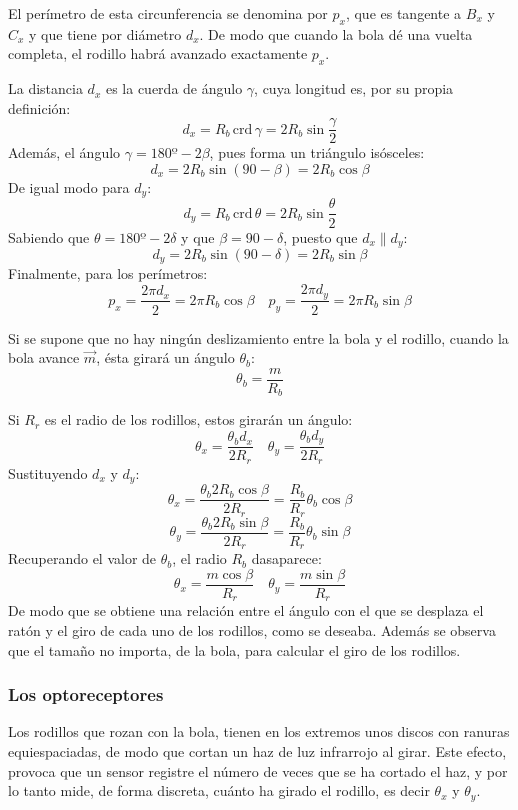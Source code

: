 \documentclass[10pt,a4paper,hidelinks,twocolumn]{article}
\begin{document}
El perímetro de esta circunferencia se denomina por $p_x$, que es tangente a 
$B_x$ y $C_x$ y que tiene por diámetro $d_x$. De modo que cuando la bola dé una 
vuelta completa, el rodillo habrá avanzado exactamente $p_x$.

La distancia $d_x$ es la cuerda de ángulo $\gamma$, cuya longitud es, por su 
propia definición:
$$ d_x = R_b \, \text{crd} \, \gamma = 2R_b \sin \frac{\gamma}{2}$$
Además, el ángulo $\gamma = 180º - 2\beta$, pues forma un triángulo isósceles:
$$ d_x = 2R_b \sin(90-\beta) = 2R_b\cos \beta$$
De igual modo para $d_y$:
$$ d_y = R_b \, \text{crd} \, \theta = 2R_b \sin \frac{\theta}{2} $$
Sabiendo que $\theta = 180º - 2\delta$ y que $\beta = 90 - \delta$, puesto que 
$d_x \parallel d_y$:
$$ d_y = 2R_b \sin (90 - \delta) = 2R_b \sin \beta $$
Finalmente, para los perímetros:
$$ p_x = \frac{2\pi d_x}{2} = 2 \pi R_b\cos \beta \quad  p_y = \frac{2\pi 
d_y}{2} = 2 \pi R_b\sin \beta $$

Si se supone que no hay ningún deslizamiento entre la bola y el rodillo, cuando 
la bola avance $\vec{m}$, ésta girará un ángulo $\theta_b$:
$$ \theta_b = \frac{m}{R_b} $$

Si $R_r$ es el radio de los rodillos, estos girarán un ángulo:
$$ \theta_x = \frac{\theta_b d_x}{2R_r} \quad
	\theta_y = \frac{\theta_b d_y}{2R_r}$$
Sustituyendo $d_x$ y $d_y$:
$$ \theta_x = \frac{\theta_b 2R_b\cos \beta}{2R_r} =
	\frac{R_b}{R_r}\theta_b\cos \beta$$
$$ \theta_y = \frac{\theta_b 2R_b\sin \beta}{2R_r} =
	\frac{R_b}{R_r}\theta_b\sin \beta$$
Recuperando el valor de $\theta_b$, el radio $R_b$ dasaparece:
\begin{equation}
\theta_x = \frac{m \cos \beta}{R_r} \quad
\theta_y = \frac{m \sin \beta}{R_r} \label{eq:bola-angulo}
\end{equation}
De modo que se obtiene una relación entre el ángulo con el que se desplaza el 
ratón y el giro de cada uno de los rodillos, como se deseaba. Además se observa 
que el tamaño no importa, de la bola, para calcular el giro de los rodillos.

\subsubsection{Los optoreceptores}

Los rodillos que rozan con la bola, tienen en los extremos unos discos con
ranuras equiespaciadas, de modo que cortan un haz de luz infrarrojo al girar.  
Este efecto, provoca que un sensor registre el número de veces que se ha cortado 
el haz, y por lo tanto mide, de forma discreta, cuánto ha girado el rodillo, es 
decir $\theta_x$ y $\theta_y$.
\end{document}
